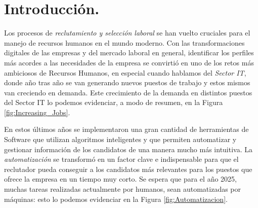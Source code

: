 \documentclass[12pt,a4paper]{article}
\begin{document}
\begin{sloppypar}
\cleardoublepage    %

\tableofcontents 	%

\cleardoublepage    %

\section{Introducción.}\label{Intro}
Los procesos de \textit{reclutamiento y selección laboral} se han vuelto cruciales para el manejo de recursos humanos en el mundo moderno. Con las transformaciones digitales de las empresas y del mercado laboral en general, identificar los perfiles más acordes a las necesidades de la empresa se convirtió en uno de los retos más ambiciosos de Recursos Humanos, en especial cuando hablamos del \textit{Sector IT}, donde año tras año se van generando nuevos puestos de trabajo y estos mismos van creciendo en demanda. Este crecimiento de la demanda en distintos puestos del Sector IT lo podemos evidenciar, a modo de resumen, en la Figura \ref{fig:Increasing_Jobs}.

En estos últimos años se implementaron una gran cantidad de herramientas de Software que utilizan algoritmos inteligentes y que permiten automatizar y gestionar información de los candidatos de una manera mucho más intuitiva\cite{trabajos_relacionados_1,trabajos_relacionados_2,trabajos_relacionados_3,trabajos_relacionados_4,
trabajos_relacionados_5,trabajos_relacionados_6,trabajos_relacionados_7,trabajos_relacionados_8,
trabajos_relacionados_9,trabajos_relacionados_10, trabajos_relacionados_11, trabajos_relacionados_12, trabajos_relacionados_13, trabajos_relacionados_14, trabajos_relacionados_15}. La \textit{automatización} se transformó en un factor clave e indispensable para que el reclutador pueda conseguir a los candidatos más relevantes para los puestos que ofrece la empresa en un tiempo muy corto.
Se espera que para el año 2025, muchas tareas realizadas actualmente por humanos, sean automatizadas por máquinas: esto lo podemos evidenciar en la Figura \ref{fig:Automatizacion}.


\end{sloppypar}
\end{document}
